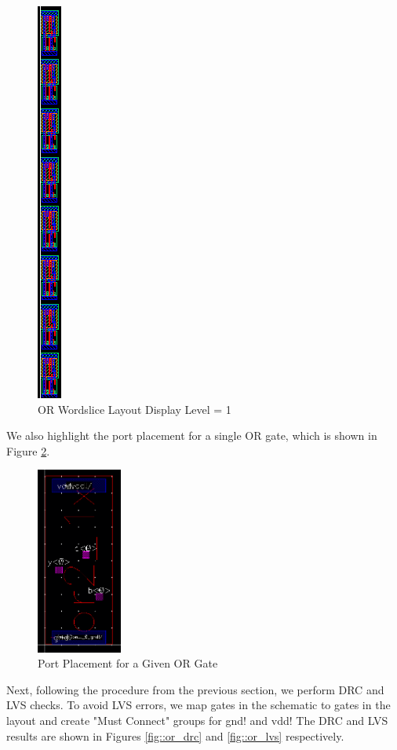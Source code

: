 \documentclass{article}
\begin{document}
	\begin{figure}[H]
		\centerline{\includegraphics[height=0.8\textwidth, angle=270]{or2_1x_8_layout_detailed.png}}
		\caption{OR Wordslice Layout Display Level = 1}
		\label{fig::or2_1x_8_layout_detailed}
	\end{figure}
	
	\noindent We also highlight the port placement for a single OR gate, which is shown in Figure \ref{fig::or2_1x_8_single_gate_ports}.
	
	\begin{figure}[H]
		\centerline{\includegraphics[width=0.25\textwidth]{or2_1x_8_single_gate_ports.png}}
		\caption{Port Placement for a Given OR Gate}
		\label{fig::or2_1x_8_single_gate_ports}
	\end{figure}
	
	\noindent Next, following the procedure from the previous section, we perform DRC and LVS checks. To avoid LVS errors, we map gates in the schematic to gates in the layout and create "Must Connect" groups for gnd! and vdd! The DRC and LVS results are shown in Figures \ref{fig::or_drc} and \ref{fig::or_lvs} respectively.
	
\end{document}
